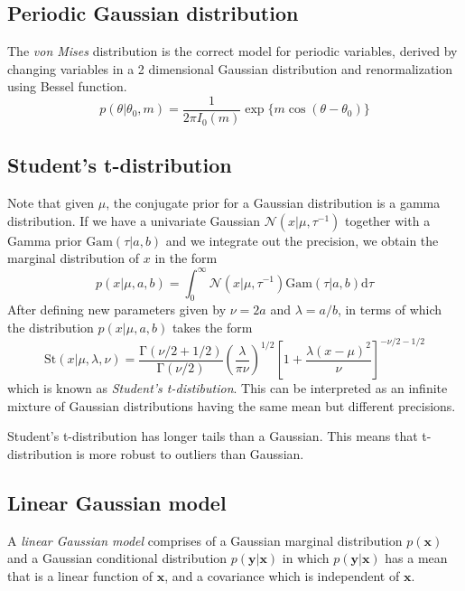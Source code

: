 \documentclass[a4paper]{book}
\newcommand{\ud}{\mathrm{d}}
\newcommand{\up}{\mathrm}
\renewcommand{\bf}{\mathbf}
\renewcommand{\cal}{\mathcal}
\newcommand{\imp}[1]{\textit{#1}}
\begin{document}
\subsection{Periodic Gaussian distribution}
The \emph{von Mises} distribution is the correct model for periodic variables, derived by changing variables in a 2 dimensional Gaussian distribution and renormalization using Bessel function.
\begin{equation}
	p(\theta|\theta_0,m)=\frac{1}{2\pi I_{0} (m)} \exp \{m \cos(\theta-\theta_0) \}
\end{equation}
\subsection{Student's t-distribution}
Note that given $\mu$, the conjugate prior for a Gaussian distribution is a gamma distribution. If we have a univariate Gaussian $\cal{N}(x|\mu,\tau^{-1})$ together with a Gamma prior $\up{Gam}(\tau|a,b)$ and we integrate out the precision, we obtain the marginal distribution of $x$ in the form
\begin{equation}
	p(x|\mu,a,b)=\int_{0}^{\infty} \cal{N}(x|\mu,\tau^{-1})\up{Gam}(\tau|a,b) \ud \tau
\end{equation}
After defining new parameters given by $\nu = 2a$ and $\lambda=a/b$, in terms of which the distribution $p(x|\mu,a,b)$ takes the form
\begin{equation}
	\up{St}(x|\mu,\lambda,\nu)=\frac{\up{\Gamma}(\nu/2+1/2)}{\up{\Gamma}(\nu/2)}\left(\frac{\lambda}{\pi \nu}\right)^{1/2}\left[1+\frac{\lambda(x-\mu)^2}{\nu}\right]^{-\nu/2-1/2}
\end{equation}
which is known as \emph{Student's t-distibution}. This can be interpreted as an infinite mixture of Gaussian distributions having the same mean but different precisions.

Student's t-distribution has longer tails than a Gaussian. This means that t-distribution is more robust to outliers than Gaussian.
\subsection{Linear Gaussian model}
A \imp{linear Gaussian model} comprises of a Gaussian marginal distribution $p(\bf{x})$ and a Gaussian conditional distribution $p(\bf{y}|\bf{x})$ in which $p(\bf{y}|\bf{x})$ has a mean that is a linear function of $\bf{x}$, and a covariance which is independent of $\bf{x}$.
\end{document}
